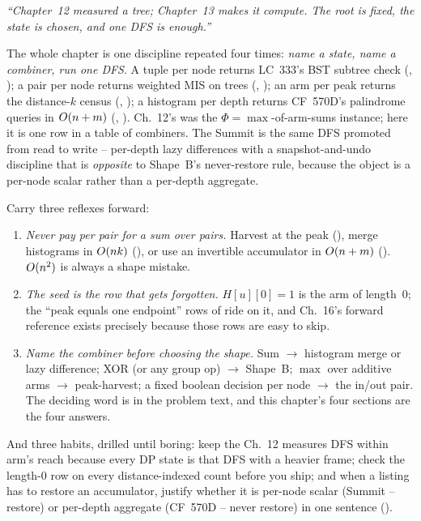 \begin{lastword}
\emph{``Chapter~12 measured a tree; Chapter~13 makes it compute. The
root is fixed, the state is chosen, and one DFS is enough.''}

\medskip
The whole chapter is one discipline repeated four times: \emph{name a
state, name a combiner, run one DFS}. A tuple per node returns LC~333's
BST subtree check (,
); a pair per node returns weighted MIS on
trees (, ); an arm
per peak returns the distance-$k$ census (,
); a histogram per depth returns CF~570D's
palindrome queries in $O(n+m)$ (,
). Ch.~12's  was the
$\Phi=\max$-of-arm-sums instance; here it is one row in a table of
combiners. The Summit is the same DFS promoted from read to write --
per-depth lazy differences with a snapshot-and-undo discipline that is
\emph{opposite} to Shape~B's never-restore rule, because the object is
a per-node scalar rather than a per-depth aggregate.

\medskip
Carry three reflexes forward:
\begin{enumerate}[nosep, leftmargin=1.6em]
  \item \emph{Never pay per pair for a sum over pairs.} Harvest at the
        peak (), merge histograms in $O(nk)$
        (), or use an invertible accumulator in
        $O(n+m)$ (). $O(n^2)$ is
        always a shape mistake.
  \item \emph{The seed is the row that gets forgotten.}
        $\mathit{H}[u][0]=1$ is the arm of length~$0$; the ``peak
        equals one endpoint'' rows of  ride on it, and
        Ch.~16's  forward reference exists precisely
        because those rows are easy to skip.
  \item \emph{Name the combiner before choosing the shape.} Sum $\to$
        histogram merge or lazy difference; XOR (or any group op) $\to$
        Shape~B; $\max$ over additive arms $\to$ peak-harvest; a fixed
        boolean decision per node $\to$ the in/out pair. The deciding
        word is in the problem text, and this chapter's four sections
        are the four answers.
\end{enumerate}

\medskip
And three habits, drilled until boring: keep the Ch.~12 measures DFS
within arm's reach because every DP state is that DFS with a heavier
frame; check the length-$0$ row on every distance-indexed count before
you ship; and when a listing has to restore an accumulator, justify
whether it is per-node scalar (Summit -- restore) or per-depth aggregate
(CF~570D -- never restore) in one sentence ().


\end{lastword}
